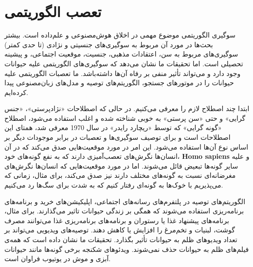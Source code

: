 {
\section*{تعصب الگوریتمی}
\label{sec:تعصب الگوریتمی}
سوگیری الگوریتمی موضوع مهمی در اخلاق هوش‌مصنوعی و علم‌داده است. بیشتر بحث‌ها در مورد آن مربوط به سوگیری‌های جنسیتی و نژادی (تا حدی کمتر) سوگیری‌های مربوط به سن، اعتقادات مذهبی، جنسیت، موقعیت اجتماعی، و پیشینه تحصیلی است. اما تحقیقات ما نشان می‌دهد که سوگیری‌های الگوریتمی علیه حیوانات وجود دارد و می‌تواند تأثیر منفی بر رفاه آن‌ها داشته‌باشد. ما تعصبات الگوریتمی علیه حیوانات  را در موتورهای جستجو، الگوریتم‌های توصیه و مدل‌های زبان‌مصنوعی پیدا کرده‌ایم.
}

ابتدا چند اصطلاح لازم را معرفی می‌کنیم.
در حالی که اصطلاحات «نژادپرستی»، «جنس گرایی» و حتی «سن پرستی» به خوبی شناخته شده و اغلب استفاده می‌شود، اصطلاح «گونه گرایی» که توسط «ریچارد رایدر» در سال 1970 معرفی شد، همتای این اصطلاحات است و برای توصیف سوگیری‌ها و تعصبات در برابر موجودات دیگر بر اساس نوع آن‌ها استفاده می‌شود.
این امر در مورد موقعیت‌هایی صدق می‌کند که در آن انسان‌ها نگرش‌های تعصب‌آمیزی دارند که به نفع گونه‌های خود، \textenglish{\textbf{Homo sapiens}} و علیه سایر گونه‌ها تبعیض قائل می‌شوند.
اما در مورد موقعیت‌هایی که انسان‌ها نگرش‌های مغرضانه‌ای نسبت به گونه‌های مختلف دارند نیز صدق می‌کند، برای مثال، زمانی که می‌پذیریم با خوک‌ها به گونه‌ای رفتار کنیم که به شدت برای سگ‌ها رد می‌کنیم.

الگوریتم‌های توصیه در پلتفرم‌های رسانه‌های اجتماعی، اپلیکیشن‌های خرید و برنامه‌های برنامه‌ریزی استفاده می‌شوند که همگی بر زندگی حیوانات تاثیر می‌گذارند.
برای مثال، برنامه‌های پیشنهاد غذا یا رستوران و برنامه‌های برنامه‌ریزی غذا می‌توانند مصرف گوشت، لبنیات و تخم‌مرغ را افزایش یا کاهش دهند.
توصیه‌های ویدیویی می‌تواند بر تعداد ویدیوهای ظلم به حیوانات تأثیر بگذارد.
تحقیقات ما نشان داده است که همه‌ی فیلم‌های ظلم به حیوانات حذف نمی‌شوند.
ویدئوهای شکنجه برخی گونه‌ها مانند حیوانات آبزی و موش در یوتیوب فراوان است.
\newline
\newline


